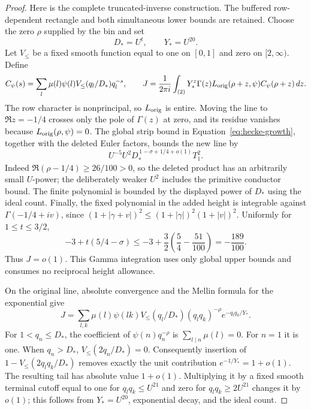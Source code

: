 \documentclass[12pt]{article}
\begin{document}
\begin{proof}
Here is the complete truncated-inverse construction.  The buffered
row-dependent rectangle and both simultaneous lower bounds are retained.
Choose the zero \(\rho\) supplied by the bin and set
\[
 D_*=U^t,\qquad Y_*=U^{20}.
\]
Let \(V_{\le}\) be a fixed smooth function equal to one on
\([0,1]\) and zero on \([2,\infty)\).  Define
\[
 C_\psi(s)=\sum_l\mu(l)\psi(l)V_{\le}(q_l/D_*)q_l^{-s},
 \qquad
 J=\frac1{2\pi i}\int_{(2)}
       Y_*^z\Gamma(z)L_{\rm orig}(\rho+z,\psi)
       C_\psi(\rho+z)\,dz.
\]
The row character is nonprincipal, so \(L_{\rm orig}\) is entire.
Moving the line to \(\Re z=-1/4\) crosses only the pole of
\(\Gamma(z)\) at zero, and its residue vanishes because
\(L_{\rm orig}(\rho,\psi)=0\).  The global strip bound
in Equation~\eqref{eq:hecke-growth}, together with the deleted
Euler factors, bounds the new line by
\[
 U^{-5}U^2D_*^{\,1-\sigma+1/4+o(1)}T_1^2.
\]
Indeed \(\Re(\rho-1/4)\ge26/100>0\), so the deleted product has
an arbitrarily small \(U\)-power; the deliberately weaker
\(U^2\) includes the primitive conductor bound.  The finite
polynomial is bounded by the displayed power of \(D_*\) using the
ideal count.  Finally, the fixed polynomial in the added height is
integrable against \(\Gamma(-1/4+iv)\), since
\((1+|\gamma+v|)^2\le(1+|\gamma|)^2(1+|v|)^2\).
Uniformly for \(1\le t\le3/2\),
\[
 -3+t(5/4-\sigma)
 \le-3+\frac32\left(\frac54-\frac{51}{100}\right)
 =-\frac{189}{100}.
\]
Thus \(J=o(1)\).  This Gamma integration uses only global upper
bounds and consumes no reciprocal height allowance.

On the original line, absolute convergence and the Mellin formula
for the exponential give
\[
 J=\sum_{l,k}\mu(l)\psi(lk)V_{\le}(q_l/D_*)
       (q_lq_k)^{-\rho}e^{-q_lq_k/Y_*}.
\]
For \(1<q_n\le D_*\), the coefficient of \(\psi(n)q_n^{-\rho}\)
is \(\sum_{l\mid n}\mu(l)=0\).  For \(n=1\) it is one.
When \(q_n>D_*\), \(V_{\le}(2q_n/D_*)=0\).
Consequently insertion of \(1-V_{\le}(2q_lq_k/D_*)\) removes
exactly the unit contribution \(e^{-1/Y_*}=1+o(1)\).
The resulting tail has absolute value \(1+o(1)\).
Multiplying it by a fixed smooth terminal cutoff equal to one for
\(q_lq_k\le U^{21}\) and zero for \(q_lq_k\ge2U^{21}\) changes it
by \(o(1)\); this follows from \(Y_*=U^{20}\), exponential decay,
and the ideal count.


\end{proof}
\end{document}

